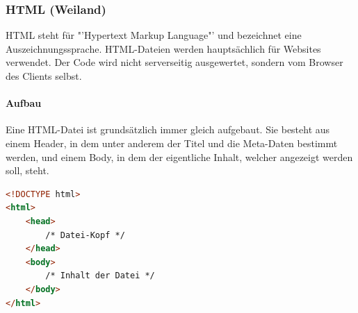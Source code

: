 \subsubsection{HTML (Weiland)}

HTML steht für "'Hypertext Markup Language"' und bezeichnet eine Auszeichnungssprache. HTML-Dateien werden hauptsächlich für Websites verwendet. Der Code wird nicht serverseitig ausgewertet, sondern vom Browser des Clients selbst.


\paragraph{Aufbau}

Eine HTML-Datei ist grundsätzlich immer gleich aufgebaut. Sie besteht aus einem Header, in dem unter anderem der Titel und die Meta-Daten bestimmt werden, und einem Body, in dem der eigentliche Inhalt, welcher angezeigt werden soll, steht.
\begin{lstlisting}[style=custom, language=HTML, caption={HTML-Tags}]
<!DOCTYPE html>
<html> 
	<head>
		/* Datei-Kopf */
	</head>
	<body>
		/* Inhalt der Datei */
	</body>
</html>
\end{lstlisting}

